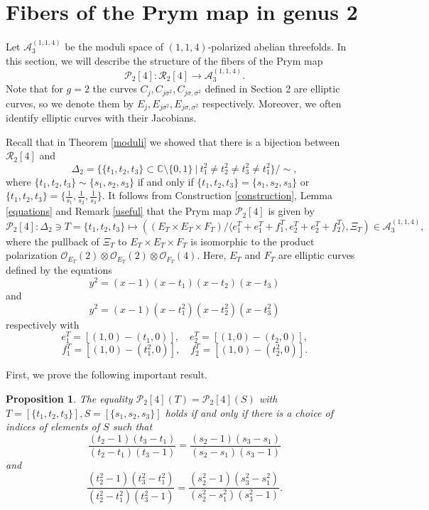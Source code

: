 \documentclass{article}
\newtheorem{prop}[thm]{Proposition}
\numberwithin{equation}{section}
\newcommand{\s}{\sigma}
\begin{document}
\section{Fibers of the Prym map in genus 2}
\label{sec4}

Let $\mathcal{A}^{(1,1,4)}_3$ be the moduli space of $(1,1,4)$-polarized abelian threefolds.  In this section, we will describe the structure of the fibers of the Prym map $$\mathcal{P}_2[4]: \mathcal{R}_{2}[4] \to \mathcal{A}_3^{(1,1,4)}.$$ 
Note that for $g=2$ the curves $C_j, C_{j\s^2}, C_{j\sigma, \sigma^2}$ defined in Section 2 are elliptic curves, so we denote them by $E_j, E_{j\s^2}, E_{j\sigma, \sigma^2}$ respectively. Moreover, we often identify elliptic curves with their Jacobians.

Recall that in Theorem \ref{moduli} we showed that there is a bijection between $\mathcal{R}_{2}[4]$ and $$\Delta_2 = \{\{t_1,t_2,t_3\} \subset \mathbb{C}\setminus \{0,1\} \ | \ t_1^2 \neq t_2^2 \neq t_3^2 \neq t_1^2\}/\sim,$$ where \(\{t_1, t_2, t_3\} \sim \{s_1, s_2, s_3\}\) if and only if $\{t_1, t_2, t_3\} = \{s_1, s_2, s_3\}$ or $\{t_1, t_2, t_3\} = \{\frac{1}{s_1}, \frac{1}{s_2}, \frac{1}{s_3}\}$. It follows from Construction \ref{construction}, Lemma \ref{equations} and Remark \ref{useful} that the Prym map $\mathcal{P}_2[4]$ is given by $$\mathcal{P}_2[4]: \Delta_2 \ni T = \{t_1,t_2,t_3\} \mapsto ((E_T \times E_T \times F_T)/\langle e_1^T + e_1^T + f_1^T, e_2^T + e_2^T + f_2^T\rangle, \Xi_T) \in \mathcal{A}_3^{(1,1,4)},$$ where the pullback of $\Xi_T$ to $E_T \times E_T \times F_T$ is isomorphic to the product polarization $ \mathcal{O}_{E_T}(2) \otimes \mathcal{O}_{E_T}(2) \otimes \mathcal{O}_{F_T}(4)$. Here, $E_T$ and $F_T$ are elliptic curves defined by the equations $$y^2 =(x - 1)(x - t_1)(x - t_2)(x - t_3)$$ and $$y^2 =(x - 1)(x - t_1^2)(x - t_2^2)(x - t_3^2)$$ respectively with $$e_1^T = [(1,0)-(t_1,0)], \quad e_2^T = [(1,0) - (t_2,0)],$$ $$f_1^T = [(1,0)-(t_1^2,0)], \quad f_2^T = [(1,0)-(t_2^2,0)].$$

First, we prove the following important result.

\begin{prop}
\label{important}
    The equality $\mathcal{P}_2[4](T) = \mathcal{P}_2[4](S)$ with $T = [\{t_1,t_2,t_3\}], S = [\{s_1, s_2, s_3\}]$ holds if and only if there is a choice of indices of elements of $S$ such that $$\frac{(t_2 - 1)(t_3 - t_1)}{(t_2 - t_1)(t_3 - 1)} = \frac{(s_2 - 1)(s_3 - s_1)}{(s_2 - s_1)(s_3 - 1)}$$ and $$
        \frac{(t_2^2 - 1)(t_3^2 - t_1^2)}{(t_2^2 - t_1^2)(t_3^2 - 1)} =  \frac{(s_2^2 - 1)(s_3^2 - s_1^2)}{(s_2^2 - s_1^2)(s_3^2 - 1)}.$$
 
\end{prop}
\end{document}
